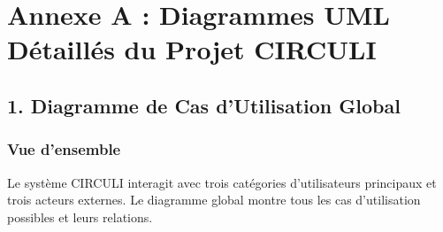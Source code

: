 \chapter*{Annexe A : Diagrammes UML Détaillés du Projet CIRCULI}

\section{1. Diagramme de Cas d'Utilisation Global}

\subsection{Vue d'ensemble}

Le système CIRCULI interagit avec trois catégories d'utilisateurs principaux et trois acteurs externes. Le diagramme global montre tous les cas d'utilisation possibles et leurs relations.

